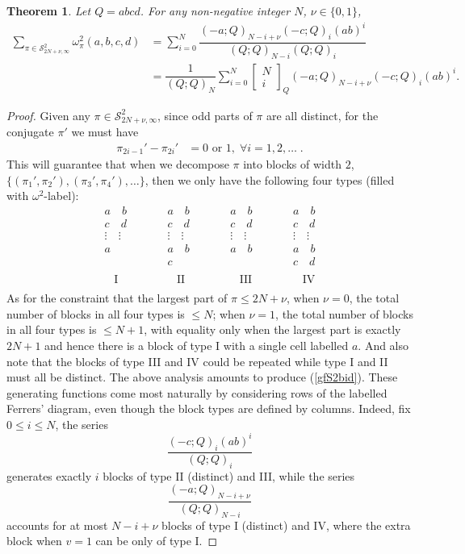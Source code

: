 \documentclass[12pt]{amsart}
\numberwithin{equation}{section}
\theoremstyle{plain}
\newtheorem{theorem}{Theorem}[section]
\theoremstyle{definition}
\newcommand\qbin[3]{\left[\begin{matrix} #1 \\ #2 \end{matrix} \right]_{#3}}
\begin{document}
\begin{theorem}\label{gfS2b} Let $Q=abcd$.
For any non-negative integer $N$, $\nu\in\{0,1\}$,
\begin{align}\label{gfS2bid}
\sum\limits_{\pi\in\mathcal{S}^2_{2N+\nu,\infty}}\omega^2_{\pi}(a,b,c,d)&=\sum\limits_{i=0}^{N}\dfrac{(-a;Q)_{N-i+\nu}(-c;Q)_{i}(ab)^i}{(Q;Q)_{N-i}(Q;Q)_{i}}\\
\nonumber &=\dfrac{1}{(Q;Q)_{N}}\sum\limits_{i=0}^{N}\qbin{N}{i}{Q}(-a;Q)_{N-i+\nu}(-c;Q)_{i}(ab)^i.
\end{align}
\end{theorem}
\begin{proof}
Given any $\pi\in\mathcal{S}^2_{2N+\nu,\infty}$, since odd parts of $\pi$ are all distinct, for the conjugate $\pi'$ we must have
\begin{align}\label{gap<2}
\pi_{2i-1}'-\pi_{2i}' &= 0 \text{ or } 1,\; \forall i=1,2,\ldots \; .
\end{align}
This will guarantee that when we decompose $\pi$ into blocks of width $2$, $\{(\pi_1',\pi_2'),(\pi_3',\pi_4'),\ldots\}$, then we only have the following four types (filled with $\omega^2$-label):
$$
\begin{array}{ccccccc}
a \quad b & \qquad & a \quad  b & \qquad & a\quad  b & \qquad & a \quad  b\\
c \quad d & \qquad & c \quad  d & \qquad & c \quad  d & \qquad & c \quad  d\\
\vdots \quad \vdots & \qquad & \vdots \quad  \vdots & \qquad &\vdots \quad \vdots & \qquad & \vdots \quad  \vdots\\
a \quad  & \qquad & a \quad b & \qquad & a \quad  b & \qquad & a \quad  b\\
 \quad & \qquad & c \quad \phantom{b} & \qquad &\quad   & \qquad & c \quad  d\\
 &&&&&&\\
\hspace{10pt}\text{I } & \qquad & \hspace{10pt}\text{II} &    \qquad &\hspace{10pt} \text{III} &    \qquad & \hspace{10pt}\text{IV}   \\
\end{array}
$$
As for the constraint that the largest part of $\pi\leq 2N+\nu$, when $\nu=0$, the total number of blocks in all four types is $\leq N$; when $\nu=1$, the total number of blocks in all four types is $\leq N+1$, with equality only when the largest part is exactly $2N+1$ and hence there is a block of type I with a single cell labelled $a$. And also note that the blocks of type III and IV could be repeated while type I and II must all be distinct. The above analysis amounts to produce (\ref{gfS2bid}). These generating functions come most naturally by considering rows of the labelled Ferrers' diagram, even though the block types are defined by columns. Indeed, fix $0\leq i\leq N$,  the series
$$\dfrac{(-c;Q)_i(ab)^i}{(Q;Q)_i}
$$ generates exactly $i$ blocks of type II (distinct) and III, while the series
$$\dfrac{(-a;Q)_{N-i+\nu}}{(Q;Q)_{N-i}}
$$ accounts for at most $N-i+\nu$ blocks of type I (distinct) and IV, where the extra block when $v=1$ can be only of type I. 
\end{proof}
\end{document}
